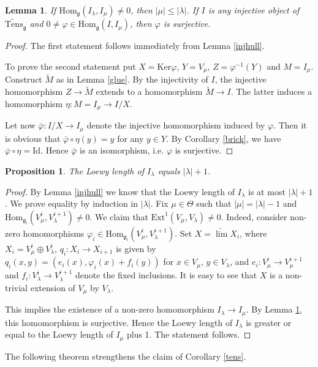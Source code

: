\documentclass{birkmult}
\newcounter{theorem}
\newtheorem{lemma}[theo]{Lemma}
\newtheorem{prop}[theo]{Proposition}
\newcommand {\Ker} {\mathrm{Ker}}
\newcommand {\Id} {\mathrm{Id}}
\renewcommand{\gg}{\mathfrak{g}}
\renewcommand {\phi} {\varphi}
\newcommand{\ext}{\mathrm{Ext}}
\newcommand{\lind}{\widetilde{\mathrm{Tens}}}
\renewcommand{\hom}{\mathrm{Hom}}
\begin{document}
\begin{lemma} \label{surj} If $\hom_\gg(I_\lambda, I_\mu)\neq 0$, then
  $|\mu|\leq|\lambda|$. If $I$ is any injective object of $\lind_\gg$
and $0\neq\phi\in \hom_\gg(I, I_\mu)$, then $\phi$ is surjective.
\end{lemma}
\begin{proof} The first statement follows immediately from Lemma
  \ref{injhull}.

To prove the second statement put $X=\Ker \phi$, $Y=V_{\mu}$,
$Z=\phi^{-1}(Y)$ and $M=I_\mu$. Construct $\tilde{M}$ as in Lemma
\ref{glue}. By the injectivity of $I$, the injective
homomorphism $Z\to \tilde{M}$ extends to a homomorphism
$\tilde{M}\to I$. The latter induces a homomorphism $\eta:
M=I_\mu\to I/X$.

Let now $\bar{\phi}:I/X\to I_{\mu}$ denote the injective
homomorphism induced by $\phi$. Then it is obvious that
$\bar{\phi}\circ\eta(y)=y$ for any $y\in Y$. By Corollary \ref{brick},
we have $\bar{\phi}\circ\eta=\Id$. Hence $\bar{\phi}$ is an
isomorphism, i.e. $\phi$ is surjective.
\end{proof}

\begin{prop}\label{linj} The Loewy length of $I_\lambda$ equals $|\lambda|+1$.
\end{prop}
\begin{proof} By Lemma \ref{injhull} we know that the  Loewy length of
  $I_\lambda$ is at most $|\lambda|+1$. We prove equality by
  induction in $|\lambda|$. Fix $\mu\in\Theta$ such that $|\mu|=|\lambda|-1$ and
$\hom_{\gg_i}(V^i_\mu,V^{i+1}_\lambda)\neq 0$. We claim that
$\ext^1  (V_\mu,V_\lambda)\neq 0$. Indeed, consider non-zero
homomorphisms $\phi_i\in \hom_{\gg_i}(V^i_\mu,V^{i+1}_\lambda)$.
Set $X=\underrightarrow{\lim}X_i$, where  $X_i=V^i_\mu\oplus
V^i_\lambda$, $q_i:X_i\to X_{i+1}$ is given by
$q_i(x,y)=(e_i(x),\phi_i(x)+f_i(y))$ for $x\in V_\mu$, $y\in
V_\lambda$, and $e_i:V^i_\mu\to V^{i+1}_\mu$
  and $f_i:V^i_\lambda\to V^{i+1}_\lambda$ denote the fixed inclusions.
It is easy to see that $X$ is a non-trivial extension of $V_\mu$ by
  $V_\lambda$.

This implies the existence of a non-zero homomorphism $I_\lambda\to I_\mu$. By
Lemma \ref{surj}, this homomorphism is surjective. Hence the Loewy length of
$I_\lambda$ is greater or equal to the Loewy length of $I_\mu$ plus 1. The
statement follows.
\end{proof}

The following theorem strengthens the claim of Corollary \ref{tens}.
\end{document}
